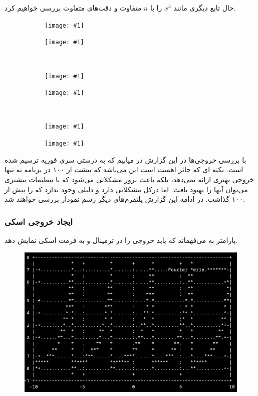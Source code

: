 \documentclass[a4paper]{report}
\newcommand{\subfigr}[2]{
	\begin{subfigure}{0.5\textwidth}
		\texttt{[image: \#1]}
		\caption*{#2}
	\end{subfigure}
}
\begin{document}
حال تابع دیگری مانند
$x^3$
را با $n$ متفاوت و دقت‌های متفاوت بررسی خواهیم کرد.

\begin{figure}[H]
\subfigr{assets/gnuplot_x3_1.png}{}
\subfigr{assets/gnuplot_x3_2.png}{}
\\[\smallskipamount]
\subfigr{assets/gnuplot_x3_5.png}{}
\subfigr{assets/gnuplot_x3_20.png}{}
\\[\smallskipamount]
\subfigr{assets/gnuplot_x3_100.png}{}
\subfigr{assets/gnuplot_x3_500.png}{}

\caption*{
}
\end{figure}

با بررسی خروجی‌ها در این گزارش در میابیم که به درستی سری فوریه ترسیم شده است. نکته ای که حائز اهمیت است
این می‌باشد که  بیشت از ۱۰۰ در برنامه  نه تنها خروجی بهتری ارائه نمی‌دهد، بلکه باعث بروز مشکلاتی می‌شود
که با تنظیمات بیشتری می‌توان آنها را بهبود یافت. اما درکل  مشکلاتی دارد و دلیلی وجود ندارد که  را بیش از ۱۰۰ گذاشت.
در ادامه این گزارش پلتفرم‌های دیگر رسم نمودار بررسی خواهند شد.

\subsubsection{ایجاد خروجی اسکی}
پارامتر  به  می‌فهماند که باید خروجی را در ترمینال و به فرمت اسکی
نمایش دهد.

\begin{figure}[H]
\includegraphics[width=\textwidth]{assets/gnuplot_term.png}
\caption*{
}
\end{figure}
\end{document}
